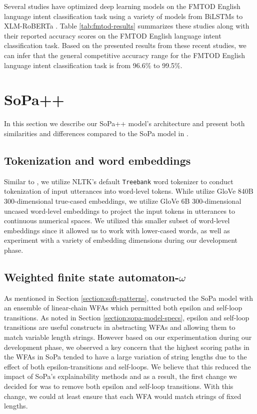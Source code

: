 Several studies have optimized deep learning models on the FMTOD English
language intent classification task using a variety of models from BiLSTMs to
XLM-RoBERTa
\citep{schuster-etal-2019-cross-lingual,zhang2019joint,zhang-etal-2020-intent}.
Table \ref{tab:fmtod-results} summarizes these studies along with their reported
accuracy scores on the FMTOD English language intent classification task. Based
on the presented results from these recent studies, we can infer that the
general competitive accuracy range for the FMTOD English language intent
classification task is from 96.6$\%$ to 99.5$\%$.

\section{SoPa++}

In this section we describe our SoPa++ model's architecture and present both
similarities and differences compared to the SoPa model in
\citet{schwartz2018sopa}.

\subsection{Tokenization and word embeddings}

Similar to \citet{schwartz2018sopa}, we utilize NLTK's default \texttt{Treebank}
word tokenizer \citep{bird-loper-2004-nltk} to conduct tokenization of input
utterances into word-level tokens. While \citet{schwartz2018sopa} utilize GloVe
840B 300-dimensional true-cased embeddings, we utilize GloVe 6B 300-dimensional
uncased word-level embeddings \citep{pennington2014glove} to project the input
tokens in utterances to continuous numerical spaces. We utilized this smaller
subset of word-level embeddings since it allowed us to work with lower-cased
words, as well as experiment with a variety of embedding dimensions during our
development phase.

\subsection{Weighted finite state automaton-$\omega$}

As mentioned in Section \ref{section:soft-patterns}, \citet{schwartz2018sopa}
constructed the SoPa model with an ensemble of linear-chain WFAs which permitted
both epsilon and self-loop transitions. As noted in Section
\ref{section:sopa-model-specs}, epsilon and self-loop transitions are useful
constructs in abstracting WFAs and allowing them to match variable length
strings. However based on our experimentation during our development phase, we
observed a key concern that the highest scoring paths in the WFAs in SoPa tended
to have a large variation of string lengths due to the effect of both
epsilon-transitions and self-loops. We believe that this reduced the impact of
SoPa's explainability methods and as a result, the first change we decided for
was to remove both epsilon and self-loop transitions. With this change, we could
at least ensure that each WFA would match strings of fixed lengths.

